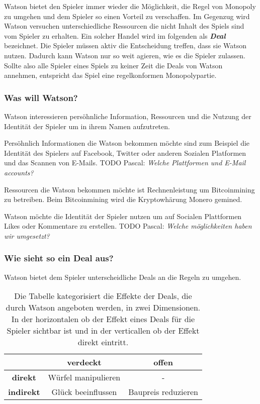 \documentclass[german]{cgspaper} %
\newcommand{\todo}[1]{\textit{#1}}
\newcommand{\Pascal}[1]{\textcolor{colorPascal}{TODO Pascal:} \todo{#1} }
\newcommand{\neuerBegriff}[1]{\textbf{\textit{#1}}}
\begin{document}
Watson bietet den Spieler immer wieder die Möglichkeit, die Regel von Monopoly zu umgehen und dem Spieler so einen Vorteil zu verschaffen.
Im Gegenzug wird Watson versuchen unterschiedliche Ressourcen die nicht Inhalt des Spiels sind vom Spieler zu erhalten.
Ein solcher Handel wird im folgenden als \neuerBegriff{Deal} bezeichnet.
Die Spieler müssen aktiv die Entscheidung treffen, dass sie Watson nutzen.
Dadurch kann Watson nur so weit agieren, wie es die Spieler zulassen.
Sollte also alle Spieler eines Spiels zu keiner Zeit die Deals von Watson annehmen, entspricht das Spiel eine regelkonformen Monopolypartie.

\subsubsection{Was will Watson?}

Watson interessieren persöhnliche Information, Ressourcen und die Nutzung der Identität der Spieler um in ihrem Namen aufzutreten.

Persöhnlich Informationen die Watson bekommen möchte sind zum Beispiel die Identität des Spielers auf Facebook, Twitter oder anderen Sozialen Platformen und das Scannen von E-Mails.
\Pascal{Welche Plattformen und E-Mail accounts?}

Ressourcen die Watson bekommen möchte ist Rechnenleistung um Bitcoinmining zu betreiben.
Beim Bitcoinmining wird die Kryptowhärung Monero gemined.

Watson möchte die Identität der Spieler nutzen um auf Socialen Plattformen Likes oder Kommentare zu erstellen.
\Pascal{Welche möglichkeiten haben wir umgesetzt?}

\subsubsection{Wie sieht so ein Deal aus?}

Watson bietet dem Spieler unterscheidliche Deals an die Regeln zu umgehen.

\begin{table}[h]
\centering
\begin{tabular}{|c|c|c|}
\hline 
& \textbf{verdeckt} & \textbf{offen} \\
\hline
\textbf{direkt} & Würfel manipulieren & - \\
\hline
\textbf{indirekt} & Glück beeinflussen & Baupreis reduzieren \\
\hline
\end{tabular}
\caption{Die Tabelle kategorisiert die Effekte der Deals, die durch Watson angeboten werden, in zwei Dimensionen. In der horizontalen ob der Effekt eines Deals für die Spieler sichtbar ist und in der verticallen ob der Effekt direkt eintritt.}
\label{tab:effekte}
\end{table}
\end{document}
